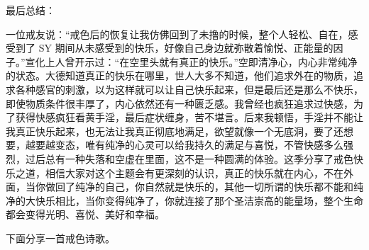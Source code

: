 最后总结：

一位戒友说：“戒色后的恢复让我仿佛回到了未撸的时候，整个人轻松、自在，感受到了 SY 期间从未感受到的快乐，好像自己身边就弥散着愉悦、正能量的因子。”宣化上人曾开示过：“在空里头就有真正的快乐。”空即清净心，内心非常纯净的状态。大德知道真正的快乐在哪里，世人大多不知道，他们追求外在的物质，追求各种感官的刺激，以为这样就可以让自己快乐起来，但是最后还是那么不快乐，即使物质条件很丰厚了，内心依然还有一种匮乏感。我曾经也疯狂追求过快感，为了获得快感疯狂看黄手淫，最后症状缠身，苦不堪言。后来我顿悟，手淫并不能让我真正快乐起来，也无法让我真正彻底地满足，欲望就像一个无底洞，要了还想要，越要越变态，唯有纯净的心灵可以给我持久的满足与喜悦，不管快感多么强烈，过后总有一种失落和空虚在里面，这不是一种圆满的体验。这季分享了戒色快乐之道，相信大家对这个主题会有更深刻的认识，真正的快乐就在内心，不在外面，当你做回了纯净的自己，你自然就是快乐的，其他一切所谓的快乐都不能和纯净的大快乐相比，当你变得纯净了，你就连接了那个圣洁崇高的能量场，整个生命都会变得光明、喜悦、美好和幸福。

下面分享一首戒色诗歌。

